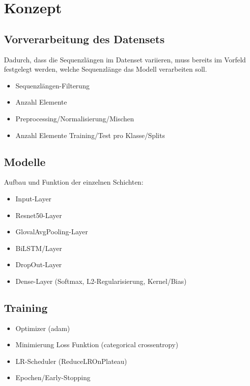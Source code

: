 \documentclass{article}
\begin{document}
    \section{Konzept}
    \subsection{Vorverarbeitung des Datensets}
    Dadurch, dass die Sequenzlängen im Datenset variieren, muss bereits im Vorfeld festgelegt werden, welche Sequenzlänge das Modell verarbeiten soll.
    
    \begin{itemize}
        \item Sequenzlängen-Filterung
        \item Anzahl Elemente
    \end{itemize}
    \begin{itemize}
        \item Preprocessing/Normalisierung/Mischen
        \item Anzahl Elemente Training/Test pro Klasse/Splits
    \end{itemize}
    \subsection{Modelle}
    Aufbau und Funktion der einzelnen Schichten:
    \begin{itemize}
        \item Input-Layer
        \item Resnet50-Layer
        \item GlovalAvgPooling-Layer
        \item BiLSTM/Layer
        \item DropOut-Layer
        \item Dense-Layer (Softmax, L2-Regularisierung, Kernel/Bias)
    \end{itemize}
    \subsection{Training}
    \begin{itemize}
        \item Optimizer (adam)
        \item Minimierung Loss Funktion (categorical crossentropy)
        \item LR-Scheduler (ReduceLROnPlateau)
        \item Epochen/Early-Stopping
    \end{itemize}
\end{document}
